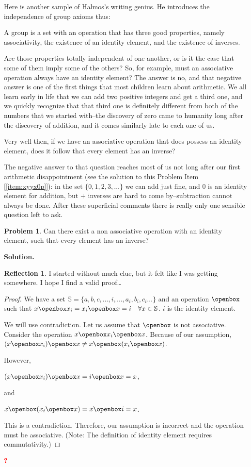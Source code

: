 \documentclass[english,notitlepage,smartquotes]{hgbreport}
\theoremstyle{definition}
\theoremstyle{definition}
\newtheorem{problem}{Problem}
\theoremstyle{remark}
\theoremstyle{definition}
\theoremstyle{plain}
\theoremstyle{definition}
\newtheorem{reflection}{Reflection}
\newcommand{\bogusproof}{\textcolor{red}{\Huge\bf ?}}
\begin{document}
Here is another sample of Halmos's writing genius. He introduces the independence of group axioms thus:
\begin{sidebar}
A group is a set with an operation that has three good properties, namely associativity, the existence of an identity element, and the existence of inverses.

Are those properties totally independent of one another, or is it the case that some of them imply some of the others? So, for example, must an associative operation always have an identity element? The answer is no, and that negative answer is one of the first things that most children learn about arithmetic. We all learn early in life that we can add two positive integers and get a third one, and we quickly recognize that that third one is definitely different from both of the numbers that we started with--the discovery of zero came to humanity long after the discovery of addition, and it comes similarly late to each one of us. 

Very well then, if we have an associative operation that does possess an identity element, does it follow that every element has an inverse?

The negative answer to that question reaches most of us not long after our first arithmetic disappointment (see the solution to this Problem Item [\ref{item:xyyx0p}]): in the set $\{0,1,2,3,\dots\}$ we can add just fine, and 0 is an identity element for addition, but $+$ inverses are hard to come by--subtraction cannot always be done. After these superficial comments there is really only one sensible question left to ask.
\end{sidebar}

\begin{problem}
Can there exist a non associative operation with an identity element, such that every element has an inverse?
\end{problem}
\textbf{Solution.}

\begin{reflection}
I started without much clue, but it felt like I was getting somewhere. I hope I find a valid proof\dots
\end{reflection}
\begin{proof}
We have a set $\mathbb{S}=\{a,b,c,\dots,i,\dots,a_i,b_i,c_i\dots\}$ and an operation $\openbox$ such that $x\openbox x_i=x_i\openbox x=i\quad\forall x\in\mathbb{S}$. $i$ is the identity element.

We will use contradiction. Let us assume that $\openbox$ is not associative. Consider the operation $x\openbox x_i\openbox x$. Because of our assumption, $(x\openbox x_i)\openbox x\ne x\openbox(x_i\openbox x)$.

However,

$(x\openbox x_i)\openbox x=i\openbox x=x$,

and

$x\openbox(x_i\openbox x)=x\openbox i=x$.


This is a contradiction. Therefore, our assumption is incorrect and the operation must be associative. (Note: The definition of identity element requires commutativity.)
\end{proof}
\bogusproof
\end{document}
